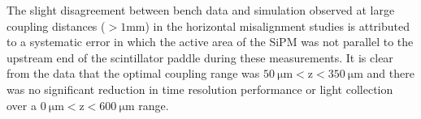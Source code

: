 The slight disagreement between bench data and simulation observed at large coupling distances ($\mathrm{> 1 mm}$) in the horizontal misalignment studies is attributed to a systematic error in which the active area of the SiPM was not parallel to the upstream end of the scintillator paddle during these measurements. It is clear from the data that the optimal coupling range was $\mathrm{50\ \mu m < z < 350\ \mu m}$ and there was no significant reduction in time resolution performance or light collection over a $\mathrm{0\ \mu m < z < 600\ \mu m}$ range.
